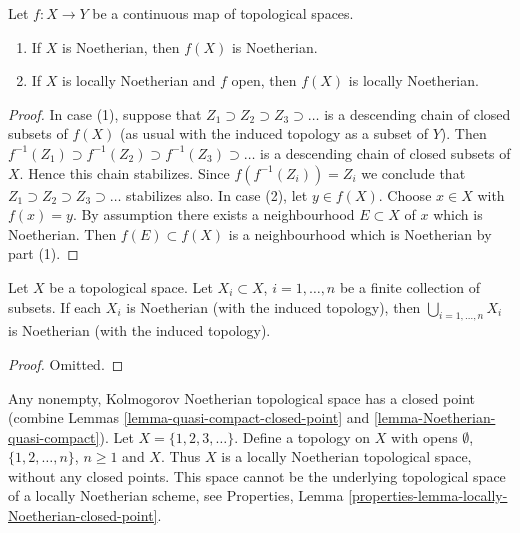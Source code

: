 \begin{lemma}
\label{lemma-image-Noetherian}
Let $f : X \to Y$ be a continuous map of topological spaces.
\begin{enumerate}
\item If $X$ is Noetherian, then $f(X)$ is Noetherian.
\item If $X$ is locally Noetherian and $f$ open, then $f(X)$ is
locally Noetherian.
\end{enumerate}
\end{lemma}

\begin{proof}
In case (1), suppose that $Z_1 \supset Z_2 \supset Z_3 \supset \ldots$
is a descending chain of closed subsets of $f(X)$ (as usual with the induced
topology as a subset of $Y$). Then
$f^{-1}(Z_1) \supset f^{-1}(Z_2) \supset f^{-1}(Z_3) \supset \ldots$ is
a descending chain of closed subsets of $X$. Hence this chain stabilizes.
Since $f(f^{-1}(Z_i)) = Z_i$ we conclude that
$Z_1 \supset Z_2 \supset Z_3 \supset \ldots$
stabilizes also. In case (2), let $y \in f(X)$. Choose $x \in X$ with
$f(x) = y$. By assumption there exists a neighbourhood $E \subset X$ of
$x$ which is Noetherian. Then $f(E) \subset f(X)$ is a neighbourhood
which is Noetherian by part (1).
\end{proof}

\begin{lemma}
\label{lemma-finite-union-Noetherian}
Let $X$ be a topological space.
Let $X_i \subset X$, $i = 1, \ldots, n$ be a finite collection of subsets.
If each $X_i$ is Noetherian (with the induced topology), then
$\bigcup_{i = 1, \ldots, n}  X_i$ is Noetherian (with the induced topology).
\end{lemma}

\begin{proof}
Omitted.
\end{proof}

\begin{example}
\label{example-locally-Noetherian-no-closed-point}
Any nonempty, Kolmogorov Noetherian topological space has a closed point
(combine Lemmas \ref{lemma-quasi-compact-closed-point} and
\ref{lemma-Noetherian-quasi-compact}).
Let $X = \{1, 2, 3, \ldots \}$. Define a topology on $X$
with opens $\emptyset$, $\{1, 2, \ldots, n\}$, $n \geq 1$
and $X$. Thus $X$ is a locally Noetherian topological space,
without any closed points. This space cannot be the underlying
topological space of a locally Noetherian scheme, see
Properties, Lemma \ref{properties-lemma-locally-Noetherian-closed-point}.
\end{example}

